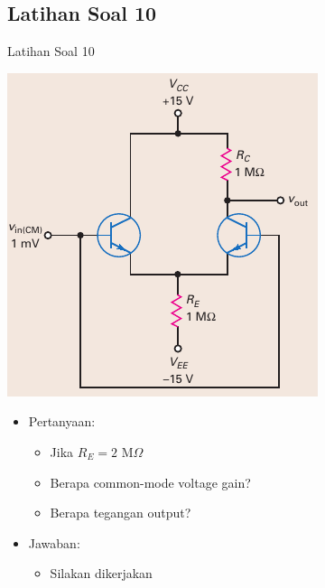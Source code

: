\documentclass[aspectratio=169]{beamer}
\begin{document}
\subsection{Latihan Soal 10}
\begin{frame}{Latihan Soal 10}
	\begin{multicols}{2}
		\begin{center}
			\includegraphics[width=\linewidth, height=0.7\textheight]{gambar/01.diff-amp/01.fig21}
		\end{center}
		\columnbreak
		\begin{itemize}
			\item Pertanyaan:
			\begin{itemize}
				\item Jika $ R_E = 2 \text{ M}\Omega $
				\item Berapa common-mode voltage gain?
				\item Berapa tegangan output?
			\end{itemize}
			\item Jawaban:
			\begin{itemize}
				\item Silakan dikerjakan
			\end{itemize}
		\end{itemize}
	\end{multicols}
\end{frame}
\end{document}
